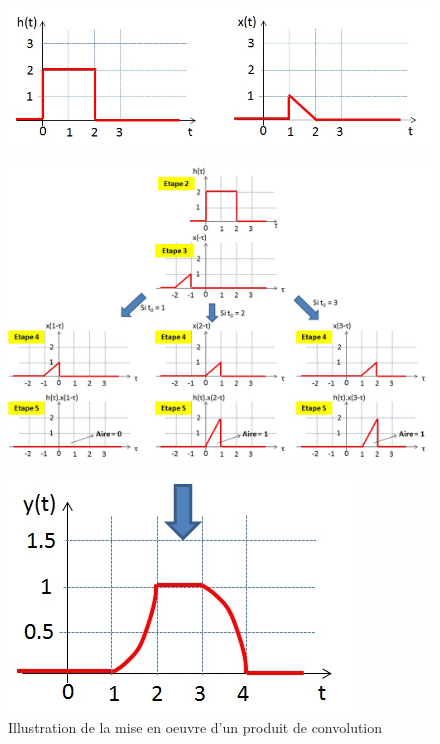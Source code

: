 	\begin{figure}[h!]
		\centering
		\includegraphics[scale=0.5]{images/Convolution_procedure_1}
	\end{figure}
	\begin{figure}[h!]
		\centering
		\includegraphics[scale=0.5]{images/Convolution_procedure_2}
	\end{figure}
	\begin{figure}[h!]
		\centering
		\includegraphics[scale=0.5]{images/Convolution_procedure_3.jpg}
		\caption{Illustration de la mise en oeuvre d'un produit de convolution}	
		\label{Fig:Mise_oeuvre_prod_convo} 
	\end{figure}
	
